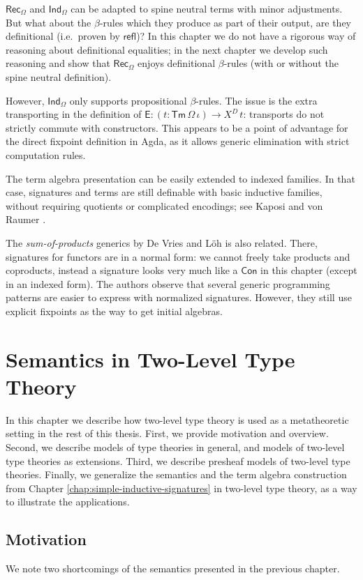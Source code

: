 \documentclass[12pt,a4paper,twoside,openany]{book}
\theoremstyle{remark}
\theoremstyle{definition}
\theoremstyle{theorem}
\newcommand{\ms}[1]{\mathsf{#1}}
\newcommand{\refl}{\mathsf{refl}}
\newcommand{\Con}{\mathsf{Con}}
\newcommand{\Tm}{\mathsf{Tm}}
\newcommand{\Rec}{\ms{Rec}}
\newcommand{\Ind}{\ms{Ind}}
\begin{document}
$\Rec_\Omega$ and $\Ind_\Omega$ can be adapted to spine neutral terms with minor
adjustments. But what about the $\beta$-rules which they produce as part of
their output, are they definitional (i.e.\ proven by $\refl$)? In this chapter
we do not have a rigorous way of reasoning about definitional equalities; in the
next chapter we develop such reasoning and show that $\Rec_\Omega$ enjoys
definitional $\beta$-rules (with or without the spine neutral
definition).

However, $\Ind_\Omega$ only supports propositional $\beta$-rules. The issue is
the extra transporting in the definition of $\ms{E} : (t : \Tm\,\Omega\,\iota)
\to X^D\,t$: transports do not strictly commute with constructors. This appears
to be a point of advantage for the direct fixpoint definition in Agda, as it
allows generic elimination with strict computation rules.

The term algebra presentation can be easily extended to indexed families. In
that case, signatures and terms are still definable with basic inductive
families, without requiring quotients or complicated encodings; see Kaposi and
von Raumer \cite{mutualinductive}.

The \emph{sum-of-products} generics by De Vries and Löh \cite{sop} is also
related. There, signatures for functors are in a normal form: we cannot freely
take products and coproducts, instead a signature looks very much like a $\Con$
in this chapter (except in an indexed form). The authors observe that several
generic programming patterns are easier to express with normalized
signatures. However, they still use explicit fixpoints as the way to get initial
algebras.

\chapter{Semantics in Two-Level Type Theory}
\label{chap:2ltt}

In this chapter we describe how two-level type theory is used as a metatheoretic
setting in the rest of this thesis. First, we provide motivation and
overview. Second, we describe models of type theories in general, and models of
two-level type theories as extensions. Third, we describe presheaf models of
two-level type theories. Finally, we generalize the semantics and the term
algebra construction from Chapter \ref{chap:simple-inductive-signatures} in
two-level type theory, as a way to illustrate the applications.

\section{Motivation}
\label{sec:2ltt-motivation}
We note two shortcomings of the semantics presented in the
previous chapter.
\end{document}
